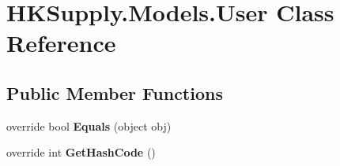 \hypertarget{class_h_k_supply_1_1_models_1_1_user}{}\section{H\+K\+Supply.\+Models.\+User Class Reference}
\label{class_h_k_supply_1_1_models_1_1_user}
\subsection*{Public Member Functions}
\begin{DoxyCompactItemize}
\item 
\mbox{\label{class_h_k_supply_1_1_models_1_1_user_a24e2282b6384346f60d42ae98dfc849f}} 
override bool {\bfseries Equals} (object obj)
\item 
\mbox{\label{class_h_k_supply_1_1_models_1_1_user_a79d46e0361441e50d049d6b729db4906}} 
override int {\bfseries Get\+Hash\+Code} ()
\end{DoxyCompactItemize}
